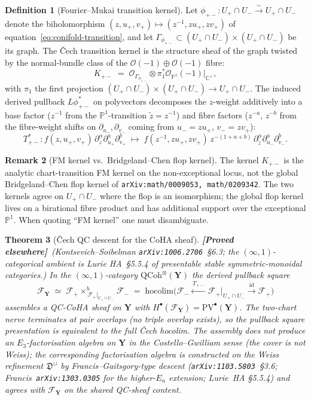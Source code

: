\documentclass[11pt]{amsart}
\newtheorem{theorem}{Theorem}[section]
\theoremstyle{definition}
\newtheorem{definition}[theorem]{Definition}
\newtheorem{remark}[theorem]{Remark}
\providecommand{\bY}{\mathbf{Y}}
\providecommand{\cO}{\mathcal{O}}
\providecommand{\cF}{\mathcal{F}}
\providecommand{\bC}{\mathbb{C}}
\providecommand{\bP}{\mathbb{P}}
\providecommand{\fD}{\mathfrak{D}}
\providecommand{\ClaimStatusProvedElsewhere}{\textbf{\textsf{[Proved elsewhere]}}}
\begin{document}
\begin{definition}[Fourier--Mukai transition kernel]
\label{def:fm-kernel}
Let $\phi_{+-} \colon U_+ \cap U_- \xrightarrow{\sim} U_+ \cap U_-$
denote the biholomorphism
$(z, u_+, v_+) \mapsto (z^{-1}, z u_+, z v_+)$ of
equation~\eqref{eq:conifold-transition}, and let
$\Gamma_{\phi_{+-}} \subset (U_+ \cap U_-) \times (U_+ \cap U_-)$ be
its graph. The \v{C}ech transition kernel is the structure sheaf of the
graph twisted by the normal-bundle class of the $\cO(-1) \oplus \cO(-1)$
fibre:
\[
  K_{+-} \;=\; \cO_{\Gamma_{\phi_{+-}}} \otimes \pi_1^* \cO_{\bP^1}(-1)\bigl|_{\bC^\times},
\]
with $\pi_1$ the first projection $(U_+ \cap U_-) \times (U_+ \cap U_-)
\to U_+ \cap U_-$. The induced derived pullback $L\phi_{+-}^*$ on
polyvectors decomposes the $z$-weight additively into a base factor
($z^{-1}$ from the $\bP^1$-transition $\tilde z = z^{-1}$) and fibre
factors ($z^{-a}$, $z^{-b}$ from the fibre-weight shifts on
$\partial_{u_-}, \partial_{v_-}$ coming from $u_- = z u_+$,
$v_- = z v_+$):
\[
  T_{+-}^* : f(z, u_+, v_+)\, \partial_z^\alpha \partial_{u_+}^a \partial_{v_+}^b
  \;\longmapsto\;
  f(z^{-1}, z u_+, z v_+)\, z^{-(1+a+b)}\, \partial_{\tilde z}^\alpha \partial_{u_-}^a \partial_{v_-}^b.
\]
\end{definition}

\begin{remark}[FM kernel vs.\ Bridgeland--Chen flop kernel]
\label{rem:fm-vs-flop}
The kernel $K_{+-}$ is the analytic chart-transition FM kernel on the
non-exceptional locus, not the global Bridgeland--Chen flop kernel of
\texttt{arXiv:math/0009053, math/0209342}. The two kernels agree on
$U_+ \cap U_-$ where the flop is an isomorphism; the global flop kernel
lives on a birational fibre product and has additional support over the
exceptional $\bP^1$. When quoting ``FM kernel'' one must disambiguate.
\end{remark}

\begin{theorem}[\v{C}ech QC descent for the CoHA sheaf]
\label{thm:cech-gluing}
\ClaimStatusProvedElsewhere\ \emph{(Kontsevich--Soibelman
\texttt{arXiv:1006.2706}~\S6.3; the $(\infty,1)$-categorical ambient is
Lurie HA~\S5.5.4 of presentable stable symmetric-monoidal categories.)}
In the $(\infty,1)$-category $\mathrm{QCoh}^\otimes(\bY)$ the derived
pullback square
\[
  \cF_{\bY} \;\simeq\; \cF_+ \times^{h}_{\,\cF_+|_{U_+ \cap U_-}\,} \cF_-
  \;=\;
  \mathrm{hocolim}\bigl(\cF_- \xleftarrow{\,T_{+-}\,}
    \cF_+|_{U_+ \cap U_-} \xrightarrow{\,\mathrm{id}\,} \cF_+\bigr)
\]
assembles a QC-CoHA sheaf on $\bY$ with
$H^\bullet(\cF_{\bY}) = \mathrm{PV}^\bullet(\bY)$. The two-chart nerve
terminates at pair overlaps (no triple overlap exists), so the pullback
square presentation is equivalent to the full \v{C}ech hocolim. The
assembly does \emph{not} produce an $E_3$-factorisation algebra on $\bY$
in the Costello--Gwilliam sense (the cover is not Weiss); the
corresponding factorisation algebra is constructed on the Weiss
refinement $\fD^{\sqcup}$ by Francis--Gaitsgory-type descent
(\texttt{arXiv:1103.5803}~\S3.6; Francis~\texttt{arXiv:1303.0305}
for the higher-$E_n$ extension; Lurie~HA \S5.5.4) and agrees with
$\cF_{\bY}$ on the shared QC-sheaf content.
\end{theorem}
\end{document}
